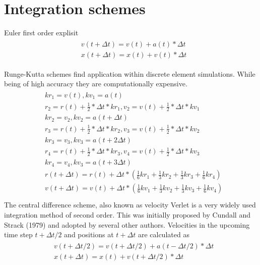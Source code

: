 \section*{Integration schemes}
Euler first order explisit
\begin{align}\label{eqn:euler}
    \begin{split}
    &v(t+\Delta{t}) = v(t) + a(t) * \Delta{t}\\
    &x(t+\Delta{t}) = x(t) + v(t) * \Delta{t}
    \end{split}
\end{align}
\par
Runge-Kutta schemes find application within discrete element simulations. While being of high
accuracy they are computationally expensive.
\begin{align}\label{eqn:rk4}
    \begin{split}
        &kr_1 = v(t), kv_1 = a(t)\\
        &r_2 = r(t) + \frac{1}{2} * \Delta{t} * kr_1, v_2 = v(t) + \frac{1}{2} * \Delta{t} * kv_1\\
        &kr_2 = v_2, kv_2 = a(t + \Delta{t})\\
        &r_3 = r(t) + \frac{1}{2} * \Delta{t} * kr_2, v_3 = v(t) + \frac{1}{2} * \Delta{t} * kv_2\\
        &kr_3 = v_3, kv_3 = a(t + 2\Delta{t})\\
        &r_4 = r(t) + \frac{1}{2} * \Delta{t} * kr_3, v_4 = v(t) + \frac{1}{2} * \Delta{t} * kv_3\\
        &kr_4 = v_4, kv_3 = a(t + 3\Delta{t})\\
        &r(t+\Delta{t}) = r(t) + \Delta{t} * (\frac{1}{6} kr_1 + \frac{1}{3} kr_2 + 
        \frac{1}{3} kr_3 + \frac{1}{6} kr_4)\\
        &v(t+\Delta{t}) = v(t) + \Delta{t} * (\frac{1}{6} kv_1 + \frac{1}{3} kv_2 + 
        \frac{1}{3} kv_3 + \frac{1}{6} kv_4)\\
    \end{split}
\end{align}
The central difference scheme, also known as velocity Verlet is a very widely used integration
method of second order. This was initially proposed by Cundall and Strack (1979) and adopted by
several other authors. Velocities in the upcoming time step $t + \Delta{t}/2 $ and positions at
$t + \Delta{t}$ are calculated as
\begin{align}\label{eqn:verlet}
    \begin{split}
        &v(t + \Delta{t}/2) = v(t + \Delta{t}/2) +a(t - \Delta{t}/2) * \Delta{t}\\
        &x(t + \Delta{t}) = x(t) +v(t + \Delta{t}/2) * \Delta{t}\\
    \end{split}
\end{align}
